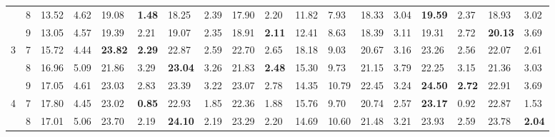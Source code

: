 \documentclass[conference]{IEEEtran}
\begin{document}
\begin{table}[]
\begin{tabular}{|cl|ll|ll|ll|ll|ll|ll|ll|ll|}
		\multicolumn{1}{|c|}{} & 8 & \multicolumn{1}{l|}{13.52} & 4.62 & \multicolumn{1}{l|}{19.08} & \textbf{1.48} & \multicolumn{1}{l|}{18.25} & 2.39 & \multicolumn{1}{l|}{17.90} & 2.20 & \multicolumn{1}{l|}{11.82} & 7.93 & \multicolumn{1}{l|}{18.33} & 3.04 & \multicolumn{1}{l|}{\textbf{19.59}} & 2.37 & \multicolumn{1}{l|}{18.93} & 3.02 \\ \cline{2-18} 
		\multicolumn{1}{|c|}{} & 9 & \multicolumn{1}{l|}{13.05} & 4.57 & \multicolumn{1}{l|}{19.39} & 2.21 & \multicolumn{1}{l|}{19.07} & 2.35 & \multicolumn{1}{l|}{18.91} & \textbf{2.11} & \multicolumn{1}{l|}{12.41} & 8.63 & \multicolumn{1}{l|}{18.39} & 3.11 & \multicolumn{1}{l|}{19.31} & 2.72 & \multicolumn{1}{l|}{\textbf{20.13}} & 3.69 \\ \hline
		\multicolumn{1}{|c|}{\multirow{3}{*}{3}} & 7 & \multicolumn{1}{l|}{15.72} & 4.44 & \multicolumn{1}{l|}{\textbf{23.82}} & \textbf{2.29} & \multicolumn{1}{l|}{22.87} & 2.59 & \multicolumn{1}{l|}{22.70} & 2.65 & \multicolumn{1}{l|}{18.18} & 9.03 & \multicolumn{1}{l|}{20.67} & 3.16 & \multicolumn{1}{l|}{23.26} & 2.56 & \multicolumn{1}{l|}{22.07} & 2.61 \\ \cline{2-18} 
		\multicolumn{1}{|c|}{} & 8 & \multicolumn{1}{l|}{16.96} & 5.09 & \multicolumn{1}{l|}{21.86} & 3.29 & \multicolumn{1}{l|}{\textbf{23.04}} & 3.26 & \multicolumn{1}{l|}{21.83} & \textbf{2.48} & \multicolumn{1}{l|}{15.30} & 9.73 & \multicolumn{1}{l|}{21.15} & 3.79 & \multicolumn{1}{l|}{22.25} & 3.15 & \multicolumn{1}{l|}{21.36} & 3.03 \\ \cline{2-18} 
		\multicolumn{1}{|c|}{} & 9 & \multicolumn{1}{l|}{17.05} & 4.61 & \multicolumn{1}{l|}{23.03} & 2.83 & \multicolumn{1}{l|}{23.39} & 3.22 & \multicolumn{1}{l|}{23.07} & 2.78 & \multicolumn{1}{l|}{14.35} & 10.79 & \multicolumn{1}{l|}{22.45} & 3.24 & \multicolumn{1}{l|}{\textbf{24.50}} & \textbf{2.72} & \multicolumn{1}{l|}{22.91} & 3.69 \\ \hline
		\multicolumn{1}{|c|}{\multirow{3}{*}{4}} & 7 & \multicolumn{1}{l|}{17.80} & 4.45 & \multicolumn{1}{l|}{23.02} & \textbf{0.85} & \multicolumn{1}{l|}{22.93} & 1.85 & \multicolumn{1}{l|}{22.36} & 1.88 & \multicolumn{1}{l|}{15.76} & 9.70 & \multicolumn{1}{l|}{20.74} & 2.57 & \multicolumn{1}{l|}{\textbf{23.17}} & 0.92 & \multicolumn{1}{l|}{22.87} & 1.53 \\ \cline{2-18} 
		\multicolumn{1}{|c|}{} & 8 & \multicolumn{1}{l|}{17.01} & 5.06 & \multicolumn{1}{l|}{23.70} & 2.19 & \multicolumn{1}{l|}{\textbf{24.10}} & 2.19 & \multicolumn{1}{l|}{23.29} & 2.20 & \multicolumn{1}{l|}{14.69} & 10.60 & \multicolumn{1}{l|}{21.48} & 3.21 & \multicolumn{1}{l|}{23.93} & 2.59 & \multicolumn{1}{l|}{23.78} & \textbf{2.04} \\ \cline{2-18} 

\end{tabular}
\end{table}
\end{document}
